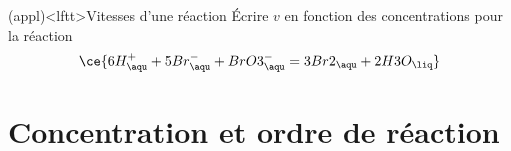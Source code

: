 \documentclass[../../main/main.tex]{subfiles}
\begin{document}

\begin{tcb}[breakable](appl)<lftt>{Vitesses d'une réaction}
	Écrire $v$ en fonction des concentrations pour la réaction
	\[
		\ce{6H^{+}_{\aqu} + 5Br^{-}_{\aqu} + BrO3^{-}_{\aqu}
			=
			3Br2_{\aqu} + 2H3O_{\liq}}
	\]
	\tcblower
	\vspace{-15pt}
\end{tcb}

\section{Concentration et ordre de réaction}
\end{document}
